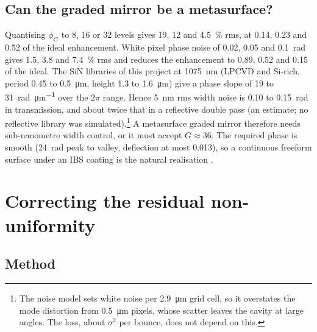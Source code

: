 \documentclass[11pt]{article}
\begin{document}
\subsection{Can the graded mirror be a metasurface?}

Quantising $\phi_G$ to 8, 16 or 32 levels gives 19, 12 and \SI{4.5}{\percent} rms, at 0.14, 0.23 and
0.52 of the ideal enhancement. White pixel phase noise of 0.02, 0.05 and \SI{0.1}{\radian} gives 1.5,
3.8 and \SI{7.4}{\percent} rms and reduces the enhancement to 0.89, 0.52 and 0.15 of the ideal. The
SiN libraries of this project at \SI{1075}{\nano\metre} (LPCVD and Si-rich, period 0.45 to
\SI{0.5}{\micro\metre}, height 1.3 to \SI{1.6}{\micro\metre}) give a phase slope of 19 to
\SI{31}{\radian\per\micro\metre} over the $2\pi$ range. Hence \SI{5}{\nano\metre} rms width noise is
0.10 to \SI{0.15}{\radian} in transmission, and about twice that in a reflective double pass (an
estimate; no reflective library was simulated).\footnote{The noise model sets white noise per
\SI{2.9}{\micro\metre} grid cell, so it overstates the mode distortion from \SI{0.5}{\micro\metre}
pixels, whose scatter leaves the cavity at large angles. The loss, about $\sigma^{2}$ per bounce, does
not depend on this.} A metasurface graded mirror therefore needs sub-nanometre width control, or it
must accept $G \approx 36$. The required phase is smooth (\SI{24}{\radian} peak to valley, deflection
at most 0.013), so a continuous freeform surface under an IBS coating is the natural realisation
.

\section{Correcting the residual non-uniformity}
\label{sec:correction}

\subsection{Method}
\end{document}
